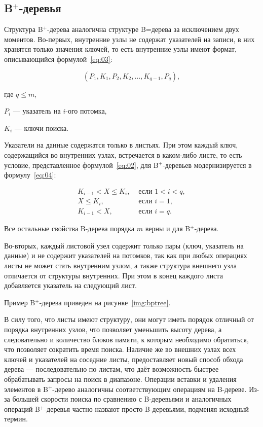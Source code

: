 \subsection{B$^+$-деревья}

Структура B$^+$-дерева аналогична структуре B=дерева за исключением двух
моментов.  Во-первых, внутренние узлы не содержат указателей на записи, в них
хранятся только значения ключей, то есть внутренние узлы имеют формат,
описывающийся формулой~\ref{eq:03}:

\begin{equation}\label{eq:03}
    (P_1, K_1, P_2, K_2, \dots, K_{q-1}, P_q),
\end{equation}

где $q \leqslant m$,

$P_i$ --- указатель на $i$-ого потомка,

$K_i$ --- ключи поиска.

Указатели на данные содержатся только в листьях. При этом каждый ключ,
содержащийся во внутренних узлах, встречается в каком-либо листе, то есть
условие, представленное формулой~\ref{eq:02}, для B$^+$-деревьев модернизируется
в формулу~\ref{eq:04}:

\begin{equation}\label{eq:04}
    \begin{aligned}
        K_{i-1} < X \leqslant K_i, & \text{ если } 1 < i < q,\\
        X \leqslant K_i, & \text{ если } i = 1,\\
        K_{i-1} < X, & \text{ если } i = q.
    \end{aligned}
\end{equation}

Все остальные свойства B-дерева порядка $m$ верны и для B$^+$-дерева.

Во-вторых, каждый листовой узел содержит только пары (ключ, указатель на данные)
и не содержит указателей на потомков, так как при любых операциях листы не может
стать внутренним узлом, а также структура внешнего узла отличается от структуры
внутренних. При этом в конец каждого листа добавляется указатель на следующий
лист.

Пример B$^+$-дерева приведен на рисунке~\ref{img:bptree}.

В силу того, что листы имеют структуру, они могут иметь порядок отличный от
порядка внутренних узлов, что позволяет уменьшить высоту дерева, а следовательно
и количество блоков памяти, к которым необходимо обратиться, что позволяет
сократить время поиска. Наличие же во внешних узлах всех ключей и указателей на
соседние листы, предоставляет новый способ обхода дерева --- последовательно по
листам, что даёт возможность быстрее обрабатывать запросы на поиск в диапазоне.
Операции вставки и удаления элементов в B$^+$-дерево аналогичны соответствующим
операциям на B-дереве. Из-за большей скорости поиска по сравнению с B-деревьями и
аналогичных операций B$^+$-деревья частно назвают просто B-деревьями, подменяя
исходный термин.

